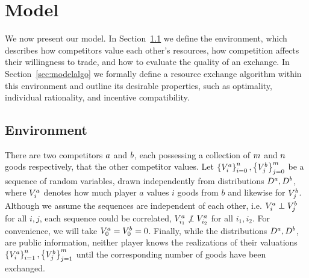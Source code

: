\section{Model}
\label{sec:model}


We now present our model. In Section~\ref{sec:modelenv} we define the environment, which describes how competitors value each other's 
resources, how competition affects their willingness to trade, and how to evaluate the quality of an exchange. 
In Section~\ref{sec:modelalgo} we formally define a resource exchange algorithm within this environment and outline its desirable properties, 
such as optimality, individual rationality, and incentive compatibility.

\subsection{Environment}
\label{sec:modelenv}

There are two competitors $a$ and $b$, each possessing 
a collection of $m$ and $n$ goods respectively, that the other competitor values.
Let \(
    \left\{
        V^a_{i}
    \right\}_{i=0}^n,
    \big\{
        V^b_{j}
    \big\}_{j=0}^m
\) be a sequence of random variables, drawn independently from distributions $D^a, D^b$, 
where $V^a_{i}$ denotes how much player $a$ values $i$ goods from $b$ and likewise for $V^b_{j}$.
Although we assume the sequences are independent of each other, i.e. $V^a_{i} \perp V^b_{j}$ for all $i,j$, 
each sequence could be correlated, $V^a_{i_1} \not\perp V^a_{i_2}$ for all $i_1,i_2$.
For convenience, we will take $V^a_{0} = V^b_{0} = 0$.
Finally, while the distributions
$D^a,D^b$,
are public information, neither player knows the realizations of their valuations
\(
    \left\{
        V^a_{i}
    \right\}_{i=1}^n,
    \big\{
        V^b_{j}
    \big\}_{j=1}^m
\)
until the corresponding number of goods have been exchanged.

